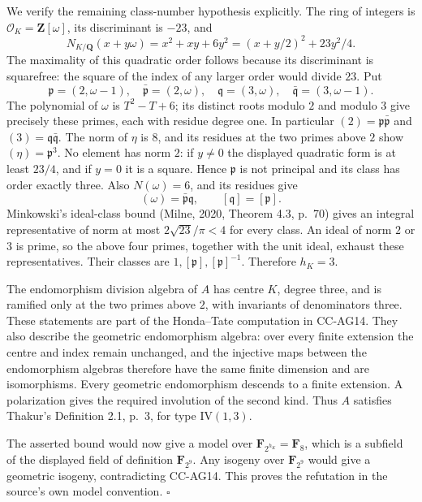We verify the remaining class-number hypothesis explicitly. The ring
of integers is $\mathcal O_K=\mathbf Z[\omega]$, its discriminant is
$-23$, and
\[
 N_{K/\mathbf Q}(x+y\omega)=x^2+xy+6y^2
             =(x+y/2)^2+23y^2/4.
\]
The maximality of this quadratic order follows because its
discriminant is squarefree: the square of the index of any larger
order would divide $23$. Put
\[
 \mathfrak p=(2,\omega-1),\quad
 \bar{\mathfrak p}=(2,\omega),\quad
 \mathfrak q=(3,\omega),\quad
 \bar{\mathfrak q}=(3,\omega-1).
\]
The polynomial of $\omega$ is $T^2-T+6$; its distinct roots modulo
$2$ and modulo $3$ give precisely these primes, each with residue
degree one. In particular
$(2)=\mathfrak p\bar{\mathfrak p}$ and
$(3)=\mathfrak q\bar{\mathfrak q}$.
The norm of $\eta$ is $8$, and its residues at the two primes above
$2$ show $(\eta)=\mathfrak p^3$. No element has norm $2$: if $y\ne0$
the displayed quadratic form is at least $23/4$, and if $y=0$ it is
a square. Hence $\mathfrak p$ is not principal and its class has
order exactly three. Also $N(\omega)=6$, and its residues give
\[
                  (\omega)=\bar{\mathfrak p}\mathfrak q,
             \qquad [\mathfrak q]=[\mathfrak p].
\]
Minkowski's ideal-class bound (Milne, 2020, Theorem 4.3, p.~70)
gives an integral representative of norm at most
$2\sqrt{23}/\pi<4$ for every class. An ideal of norm $2$ or $3$ is
prime, so the above four primes, together with the unit ideal,
exhaust these representatives. Their classes are
$1,[\mathfrak p],[\mathfrak p]^{-1}$. Therefore $h_K=3$.

The endomorphism division algebra of $A$ has centre $K$, degree
three, and is ramified only at the two primes above $2$, with
invariants of denominators three. These statements are part of the
Honda--Tate computation in CC-AG14. They also describe the geometric
endomorphism algebra: over every finite extension the centre and
index remain unchanged, and the injective maps between the
endomorphism algebras therefore have the same finite dimension and
are isomorphisms. Every geometric endomorphism descends to a finite
extension. A polarization gives the required involution of the
second kind. Thus $A$ satisfies Thakur's Definition 2.1, p.~3, for
type $\mathrm{IV}(1,3)$.

The asserted bound would now give a model over
$\mathbf F_{2^{h_K}}=\mathbf F_8$, which is a subfield of the
displayed field of definition $\mathbf F_{2^9}$. Any isogeny over
$\mathbf F_{2^9}$ would give a geometric isogeny, contradicting
CC-AG14. This proves the refutation in the source's own model
convention. $\square$

